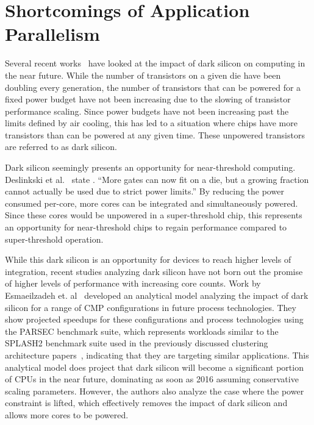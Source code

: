 \section{Shortcomings of Application Parallelism}

Several recent works~\cite{Esmaeilzadeh2011Dark-silicon-an,Hardavellas:2011de}
have looked at the impact of dark silicon on computing in the near future. While
the number of transistors on a given die have been doubling every generation,
the number of transistors that can be powered for a fixed power budget have not
been increasing due to the slowing of transistor performance scaling. Since
power budgets have not been increasing past the limits defined by air cooling,
this has led to a situation where chips have more transistors than can be
powered at any given time. These unpowered transistors are referred to as dark
silicon.

Dark silicon seemingly presents an opportunity for near-threshold computing.
Deslinkski et al.~\cite{dreslinski2010near} state . ``More gates can now fit on
a die, but a growing fraction cannot actually be used due to strict power
limits.'' By reducing the power consumed per-core, more cores can be integrated
and simultaneously powered. Since these cores would be unpowered in a
super-threshold chip, this represents an opportunity for near-threshold chips to
regain performance compared to super-threshold operation.

While this dark silicon is an opportunity for devices to reach higher levels of
integration, recent studies analyzing dark silicon have not born out the promise
of higher levels of performance with increasing core counts.
Work by Esmaeilzadeh et. al~\cite{Esmaeilzadeh2011Dark-silicon-an}
developed an analytical model analyzing the impact of dark silicon for a range
of CMP configurations in future process technologies. They show projected
speedups for these configurations and process technologies using the PARSEC
benchmark suite, which represents workloads similar to the SPLASH2 benchmark
suite used in the previously discussed clustering architecture
papers~\cite{dreslinski2010near,Zhai:2007kn}, indicating that they are
targeting similar applications. This analytical model does project that
dark silicon will become a significant portion of CPUs in the near future,
dominating as soon as 2016 assuming conservative scaling parameters. However,
the authors also analyze the case where the power constraint is lifted, which
effectively removes the impact of dark silicon and allows more cores to be
powered.

